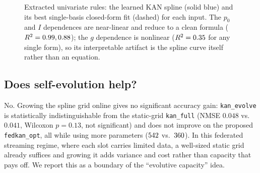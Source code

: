 \documentclass[journal]{IEEEtran}
\newcommand{\KFnmse}{0.041}\newcommand{\KFnmsesd}{0.012}
\newcommand{\KEnmse}{0.048}\newcommand{\KEreg}{0.019}
\newcommand{\pEvolve}{0.13}\newcommand{\winNmse}{14/20}\newcommand{\winReg}{19/20}
\begin{document}
\begin{figure}[t]
\centering
{}
\caption{Extracted univariate rules: the learned KAN spline (solid blue) and its
best single-basis closed-form fit (dashed) for each input. The $p_0$ and $I$
dependences are near-linear and reduce to a clean formula ($R^2=0.99,
0.88$); the $g$ dependence is nonlinear ($R^2=0.35$ for any single
form), so its interpretable artifact is the spline curve itself rather than an
equation.}
\label{fig:rules}
\end{figure}

\subsection{Does self-evolution help?}
No. Growing the spline grid online gives no significant accuracy gain:
\texttt{kan\_evolve} is statistically indistinguishable from the static-grid
\texttt{kan\_full} (NMSE $\KEnmse$ vs.\ $\KFnmse$, Wilcoxon $p=\pEvolve$, not
significant) and does not improve on the proposed \texttt{fedkan\_opt}, all while
using more parameters ($542$ vs.\ $360$). In this federated streaming regime,
where each slot carries limited data, a well-sized static grid already suffices and
growing it adds variance and cost rather than capacity that pays off. We report
this as a boundary of the ``evolutive capacity'' idea.
\end{document}
